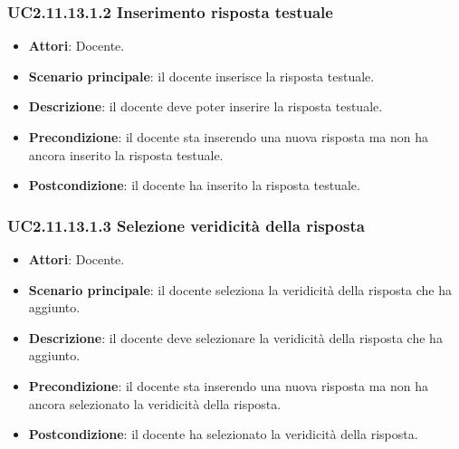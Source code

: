 \subsubsection{UC2.11.13.1.2 Inserimento risposta testuale}
\begin{itemize}
\item \textbf{Attori}: Docente.
\item \textbf{Scenario principale}: il docente inserisce la risposta testuale.
\item \textbf{Descrizione}: il docente deve poter inserire la risposta testuale.
\item \textbf{Precondizione}: il docente sta inserendo una nuova risposta ma non ha ancora inserito la risposta testuale.
\item \textbf{Postcondizione}: il docente ha inserito la risposta testuale.
\end{itemize}
\subsubsection{UC2.11.13.1.3 Selezione veridicità della risposta}
\begin{itemize}
\item \textbf{Attori}: Docente.
\item \textbf{Scenario principale}: il docente seleziona la veridicità della risposta che ha aggiunto.
\item \textbf{Descrizione}: il docente deve selezionare la veridicità della risposta che ha aggiunto.
\item \textbf{Precondizione}: il docente sta inserendo una nuova risposta ma non ha ancora selezionato la veridicità della risposta.
\item \textbf{Postcondizione}: il docente ha selezionato la veridicità della risposta.
\end{itemize}
